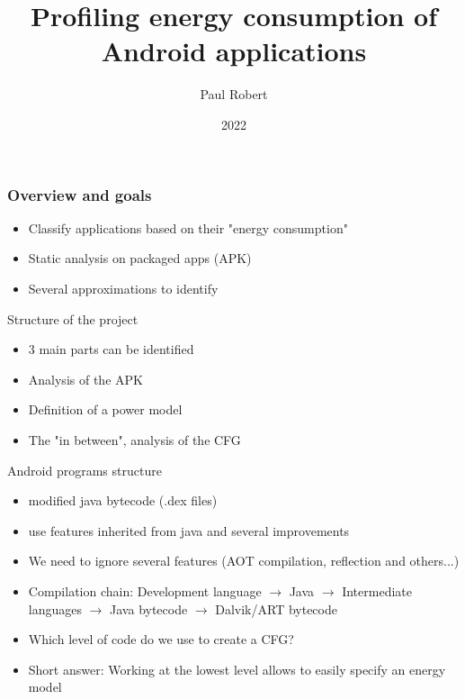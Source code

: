 \documentclass{beamer}
\title{Profiling energy consumption of Android applications}
\author{Paul Robert}
\date{2022}
\begin{document}
\frame{\titlepage}

\begin{frame}
\frametitle{Overview and goals}
\pause
\begin{itemize}
    \item Classify applications based on their "energy consumption"
    \pause
    \item Static analysis on packaged apps (APK)
    \pause
    \item Several approximations to identify
\end{itemize}


\end{frame}


\begin{frame}{Structure of the project}
\begin{itemize}
    \item 3 main parts can be identified
    \pause
    \item Analysis of the APK
    \pause 
    \item Definition of a power model
    \pause
    \item The "in between", analysis of the CFG
\end{itemize}

\end{frame}

\begin{frame}{Android programs structure}
\begin{itemize}
    \item modified java bytecode (.dex files) 
    \pause
    \item use features inherited from java and several improvements
    \pause
    \item We need to ignore several features (AOT compilation, reflection and others...)
    \pause
    \item Compilation chain: Development language $\rightarrow$ Java $\rightarrow$ Intermediate languages $\rightarrow$ Java bytecode $\rightarrow$ Dalvik/ART bytecode
    \pause
    \item Which level of code do we use to create a CFG? 
    \pause
    \item Short answer: Working at the lowest level allows to easily specify an energy model
\end{itemize}
    
\end{frame}
\end{document}

